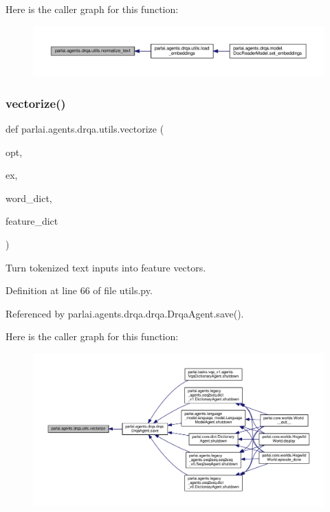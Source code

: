 Here is the caller graph for this function\+:
\nopagebreak
\begin{figure}[H]
\begin{center}
\leavevmode
\includegraphics[width=350pt]{namespaceparlai_1_1agents_1_1drqa_1_1utils_a125ab4e64306060e9ecaa3999f7be6b6_icgraph}
\end{center}
\end{figure}
\mbox{\label{namespaceparlai_1_1agents_1_1drqa_1_1utils_a5c76cc39e3014c7bcf9199d566dbdc0f}} 
\subsubsection{\texorpdfstring{vectorize()}{vectorize()}}
{\footnotesize\ttfamily def parlai.\+agents.\+drqa.\+utils.\+vectorize (\begin{DoxyParamCaption}\item[{}]{opt,  }\item[{}]{ex,  }\item[{}]{word\+\_\+dict,  }\item[{}]{feature\+\_\+dict }\end{DoxyParamCaption})}

\begin{DoxyVerb}Turn tokenized text inputs into feature vectors.\end{DoxyVerb}
 

Definition at line 66 of file utils.\+py.



Referenced by parlai.\+agents.\+drqa.\+drqa.\+Drqa\+Agent.\+save().

Here is the caller graph for this function\+:
\nopagebreak
\begin{figure}[H]
\begin{center}
\leavevmode
\includegraphics[width=350pt]{namespaceparlai_1_1agents_1_1drqa_1_1utils_a5c76cc39e3014c7bcf9199d566dbdc0f_icgraph}
\end{center}
\end{figure}
